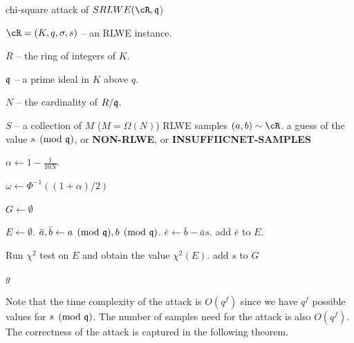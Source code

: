 \documentclass{amsart}
\begin{document}
\begin{algorithm}[H] \label{alg: chi-square}
\caption{chi-square attack of $SRLWE(\cR,\fq$)}          %
\label{IPR}                           %
\begin{algorithmic}[1]              %
     \Require

     $\cR = (K,q,\sigma, s)$ -- an RLWE instance.

     $R$ -- the ring of integers of $K$.

     $\mathfrak{q}$ -- a prime ideal in $K$ above $q$.

     $N$ -- the cardinality of $R/\mathfrak{q}$.

     $S$ -- a collection of $M$ ($M = \Omega(N)$) RLWE samples $(a,b) \sim \cR$.
    \Ensure a guess of the value $s \pmod{\mathfrak{q}}$, or {\bf NON-RLWE}, or {\bf INSUFFIICNET-SAMPLES}


    \State $\alpha \gets 1 - \frac{1}{10N}$.

    \State $\omega \gets \Phi^{-1}((1+\alpha)/2)$

    \State $G \gets \emptyset$

        \State $E \gets \emptyset$.
            \State $\bar{a}, \bar{b} \gets a \pmod{\mathfrak{q}}, b \pmod{\mathfrak{q}}$.
            \State $\bar{e} \gets \bar{b} - \bar{a}s$.
            \State add $\bar{e}$ to $E$.
        \EndFor

        \State Run $\chi^2$ test on $E$ and obtain the value $\chi^2(E)$.
            \State add $s$ to $G$
        \EndIf
    \EndFor


        \Return $g$
    \Else

    \EndIf

\end{algorithmic}
\end{algorithm}

Note that the time complexity of the attack is $O(q^{f})$ since we have $q^f$ possible values for $s \pmod {\mathfrak{q}}$. The number of samples need for the attack is also $O(q^f)$. The correctness of the attack is captured in the following theorem.
\end{document}
